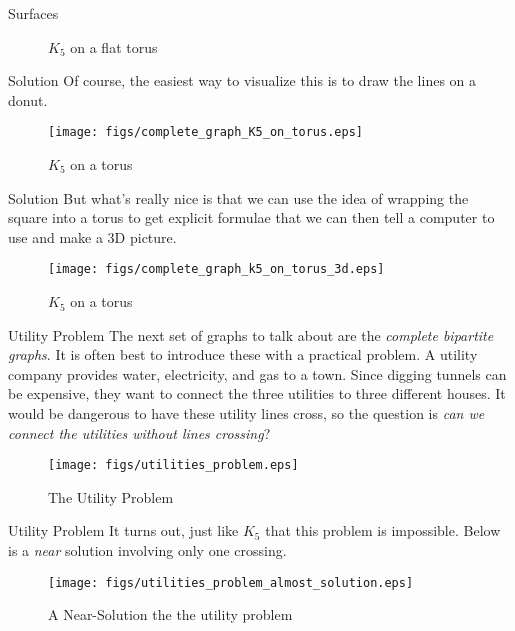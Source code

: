\documentclass{beamer}
\begin{document}
    \begin{frame}{Surfaces}
        \begin{figure}
            \centering
            \caption{$K_{5}$ on a flat torus}
            \label{fig:K_5_flat_torus_plane}
        \end{figure}
    \end{frame}
    \begin{frame}{Solution}
        Of course, the easiest way to visualize this is to draw the lines on a donut.
        \begin{figure}
            \centering
            \texttt{[image: figs/complete\_graph\_K5\_on\_torus.eps]}
            \caption{$K_{5}$ on a torus}
            \label{fig:K_5_torus}
        \end{figure}
    \end{frame}
    \begin{frame}{Solution}
        But what's really nice is that we can use the idea of wrapping the square into a torus
        to get explicit formulae that we can then tell a computer to use and make a 3D picture.
        \begin{figure}
            \centering
            \texttt{[image: figs/complete\_graph\_k5\_on\_torus\_3d.eps]}
            \caption{$K_{5}$ on a torus}
            \label{fig:k5_on_3d_torus}
        \end{figure}
    \end{frame}
    \begin{frame}{Utility Problem}
        The next set of graphs to talk about are the \textit{complete bipartite graphs}. It is often best to
        introduce these with a practical problem. A utility company provides water, electricity, and gas to a town.
        Since digging tunnels can be expensive, they want to connect the three utilities to three different houses.
        It would be dangerous to have these utility lines cross, so the question is
        \textit{can we connect the utilities without lines crossing}?
        \begin{figure}
            \centering
            \texttt{[image: figs/utilities\_problem.eps]}
            \caption{The Utility Problem}
            \label{fig:utility_problem}
        \end{figure}
    \end{frame}
    \begin{frame}{Utility Problem}
        It turns out, just like $K_{5}$ that this problem is impossible. Below is a \textit{near} solution
        involving only one crossing.
        \begin{figure}
            \centering
            \texttt{[image: figs/utilities\_problem\_almost\_solution.eps]}
            \caption{A Near-Solution the the utility problem}
            \label{fig:utility_problem_almost_solution}
        \end{figure}
    \end{frame}
\end{document}
